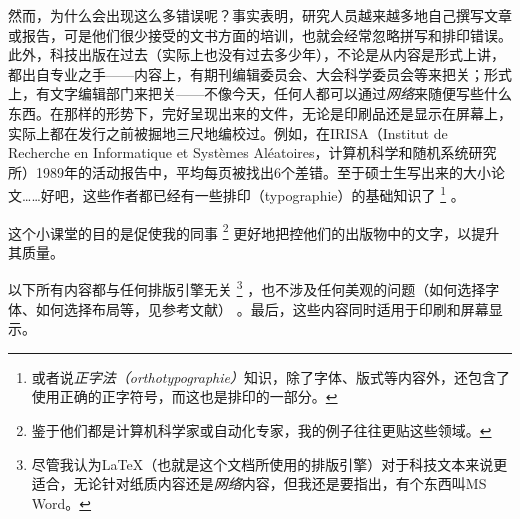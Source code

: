 然而，为什么会出现这么多错误呢？事实表明，研究人员越来越多地自己撰写文章或报告，可是他们很少接受的文书方面的培训，也就会经常忽略拼写和排印错误。此外，科技出版在过去（实际上也没有过去多少年），不论是从内容是形式上讲，都出自专业之手——内容上，有期刊编辑委员会、大会科学委员会等来把关；形式上，有文字编辑部门来把关——不像今天，任何人都可以通过\emph{网络}来随便写些什么东西。在那样的形势下，完好呈现出来的文件，无论是印刷品还是显示在屏幕上，实际上都在发行之前被掘地三尺地编校过。例如，在IRISA（Institut de Recherche en Informatique et Systèmes Aléatoires，计算机科学和随机系统研究所）1989年的活动报告中，平均每页被找出6个差错。至于硕士生写出来的大小论文……好吧，这些作者都已经有一些排印（typographie）的基础知识了
    \footnote{或者说\emph{正字法（orthotypographie）}知识，除了字体、版式等内容外，还包含了使用正确的正字符号，而这也是排印的一部分。}
。

这个小课堂的目的是促使我的同事
    \footnote{鉴于他们都是计算机科学家或自动化专家，我的例子往往更贴这些领域。}
更好地把控他们的出版物中的文字，以提升其质量。

以下所有内容都与任何排版引擎无关
    \footnote{尽管我认为\LaTeX （也就是这个文档所使用的排版引擎）对于科技文本来说更适合，无论针对纸质内容还是\emph{网络}内容，但我还是要指出，有个东西叫MS Word。}
，也不涉及任何美观的问题（如何选择字体、如何选择布局等，见参考文献）%
。最后，这些内容同时适用于印刷和屏幕显示。